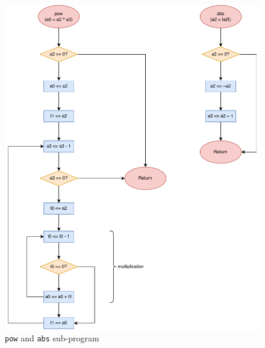 \documentclass[12pt,a4paper,oneside]{book} %
\begin{document}
\begin{figure}[H]
    \centering
    \includegraphics[width=.9\textwidth]{images/flowchart/pow_abs.pdf}
    \caption{\texttt{pow} and \texttt{abs} sub-program}
\end{figure}
\end{document}
